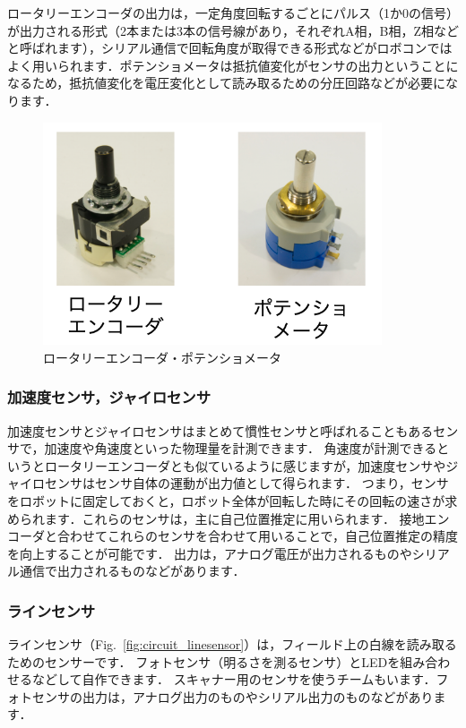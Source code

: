 ロータリーエンコーダの出力は，一定角度回転するごとにパルス（1か0の信号）が出力される形式（2本または3本の信号線があり，それぞれA相，B相，Z相などと呼ばれます），シリアル通信で回転角度が取得できる形式などがロボコンではよく用いられます．ポテンショメータは抵抗値変化がセンサの出力ということになるため，抵抗値変化を電圧変化として読み取るための分圧回路などが必要になります．

\begin{figure}[h]
  \centering
  \includegraphics[width=10cm]{circuit/fig/enc.png}
  \caption{ロータリーエンコーダ・ポテンショメータ}
  \label{fig:circuit_enc}
\end{figure}

\subsubsection{加速度センサ，ジャイロセンサ}

加速度センサとジャイロセンサはまとめて慣性センサと呼ばれることもあるセンサで，加速度や角速度といった物理量を計測できます．
角速度が計測できるというとロータリーエンコーダとも似ているように感じますが，加速度センサやジャイロセンサはセンサ自体の運動が出力値として得られます．
つまり，センサをロボットに固定しておくと，ロボット全体が回転した時にその回転の速さが求められます．これらのセンサは，主に自己位置推定に用いられます．
接地エンコーダと合わせてこれらのセンサを合わせて用いることで，自己位置推定の精度を向上することが可能です．
出力は，アナログ電圧が出力されるものやシリアル通信で出力されるものなどがあります．

\subsubsection{ラインセンサ}

ラインセンサ（Fig.~\ref{fig:circuit_linesensor}）は，フィールド上の白線を読み取るためのセンサーです．
フォトセンサ（明るさを測るセンサ）とLEDを組み合わせるなどして自作できます．
スキャナー用のセンサを使うチームもいます．フォトセンサの出力は，アナログ出力のものやシリアル出力のものなどがあります．

